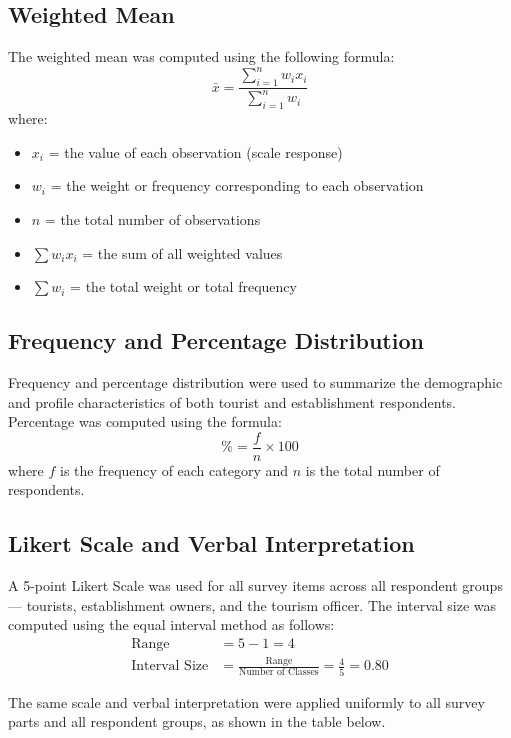 \documentclass{research}
\begin{document}
\subsection*{Weighted Mean}
The weighted mean was computed using the following formula:
\begin{equation*}
    \bar{x} = \frac{\sum_{i=1}^{n} w_i x_i}{\sum_{i=1}^{n} w_i}
\end{equation*}
where:
\begin{itemize}
    \item $x_i$ = the value of each observation (scale response)
    \item $w_i$ = the weight or frequency corresponding to each observation
    \item $n$ = the total number of observations
    \item $\sum w_i x_i$ = the sum of all weighted values
    \item $\sum w_i$ = the total weight or total frequency
\end{itemize}

\subsection*{Frequency and Percentage Distribution}
Frequency and percentage distribution were used to summarize the demographic and profile characteristics of both tourist and establishment respondents. Percentage was computed using the formula:
\begin{equation*}
    \% = \frac{f}{n} \times 100
\end{equation*}
where $f$ is the frequency of each category and $n$ is the total number of respondents.

\subsection*{Likert Scale and Verbal Interpretation}
A 5-point Likert Scale was used for all survey items across all respondent groups — tourists, establishment owners, and the tourism officer. The interval size was computed using the equal interval method as follows:
\begin{align*}
    \text{Range} &= 5 - 1 = 4 \\
    \text{Interval Size} &= \frac{\text{Range}}{\text{Number of Classes}} = \frac{4}{5} = 0.80
\end{align*}

The same scale and verbal interpretation were applied uniformly to all survey parts and all respondent groups, as shown in the table below.
\end{document}

